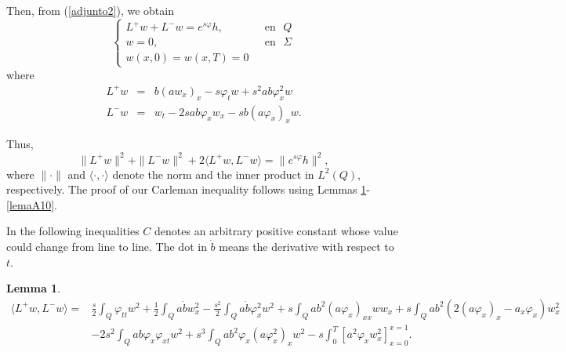 \documentclass[11pt,oneside,a4papper]{osajnl}
\newtheorem{lema}{Lemma}
\begin{document}
Then, from (\ref{adjunto2}), we obtain
\begin{equation}\label{adjunto22}
	\begin{cases}
		L^+ w+L^- w=e^{s\varphi}h, & \ \ \ \text{en} \ \ \ {Q}\\
		w=0, & \ \ \ \text{en} \ \ \ {\Sigma}\\
		w(x,0)=w(x,T)=0
	\end{cases}
\end{equation}
where
\begin{eqnarray*}
	L^+ w&=&b(a w_x)_x-s\varphi_t w+s^2ab\varphi^2_x w\\
	L^- w&=&w_t-2sab\varphi_x w_x-sb(a\varphi_x)_x w.
\end{eqnarray*}

Thus,
$$\|L^+ w\|^2+\|L^- w\|^2+2\langle L^+ w,L^- w \rangle=\|e^{s\varphi} h\|^2,$$
where $\|\cdot\|$ and $\langle \cdot,\cdot\rangle$ denote the norm and the inner product in $L^2(Q)$, respectively. The proof of our Carleman inequality follows using Lemmas \ref{lemaA1}-\ref{lemaA10}.

In the following inequalities $C$ denotes an arbitrary positive constant whose value could change from line to line. The dot in $\dot b$ means the derivative with respect to $t$.
\begin{lema}\label{lemaA1}	
    \begin{align*}
    \langle L^+ w,L^- w \rangle = &\frac{s}  {2}\int_{Q}\varphi_{tt}w^2+\frac{1}{2}\int_{Q}a\dot{b}w_x^2-\frac{s^2}{2}\int_{Q}a\dot{b} \varphi_x^2 w^2+s\int_{Q}ab^2 (a\varphi_x)_{xx}w w_x+s\int_{Q}ab^2(2(a \varphi_{x})_x - a_x \varphi_x )w_x^2\\
    &-2s^2\int_{Q}ab \varphi_x \varphi_{xt}w^2 + s^3\int_{Q}  ab^2 \varphi_x (a\varphi_x^2)_x w^2-s\int_{0}^{T}\left[ a^2\varphi_xw_x^2  \right]_{x=0}^{x=1}.
    \end{align*}
\end{lema}
\end{document}
